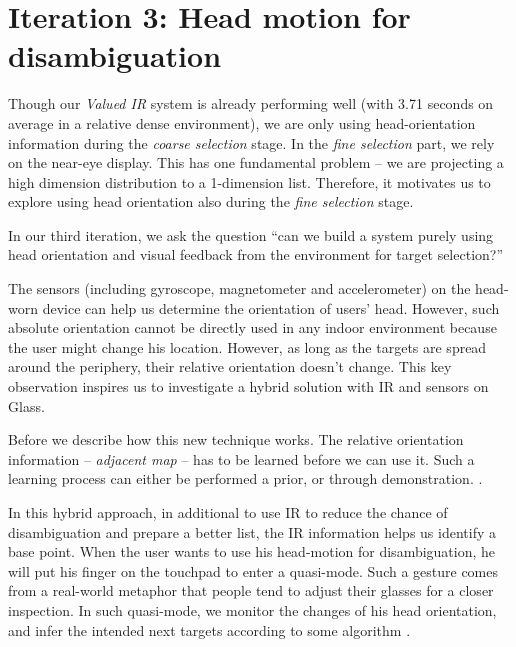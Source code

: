 \section{Iteration 3: Head motion for disambiguation}
\label{sec:iteration-3:-head}

Though our {\em Valued IR} system is already performing well (with 3.71 seconds on average in a relative dense environment), we are only using head-orientation information during the {\em coarse selection} stage. In the {\em fine selection} part, we rely on the near-eye display. This has one fundamental problem -- we are projecting a high dimension distribution to a 1-dimension list. Therefore, it motivates us to explore using head orientation also during the {\em fine selection} stage. 

In our third iteration, we ask the question ``can we build a system purely using head orientation and visual feedback from the environment for target selection?''

The sensors (including gyroscope, magnetometer and accelerometer) on the head-worn device can help us determine the orientation of users' head. However, such absolute orientation cannot be directly used in any indoor environment because the user might change his location. However, as long as the targets are spread around the periphery, their relative orientation doesn't change. This key observation inspires us to investigate a hybrid solution with IR and sensors on Glass.

Before we describe how this new technique works. The relative orientation information -- {\em adjacent map} -- has to be learned before we can use it. Such a learning process can either be performed a prior, or through demonstration. .

In this hybrid approach, in additional to use IR to reduce the chance of disambiguation and prepare a better list, the IR information helps us identify a base point. When the user wants to use his head-motion for disambiguation, he will put his finger on the touchpad to enter a quasi-mode. Such a gesture comes from a real-world metaphor that people tend to adjust their glasses for a closer inspection. In such quasi-mode, we monitor the changes of his head orientation, and infer the intended next targets according to some algorithm .




